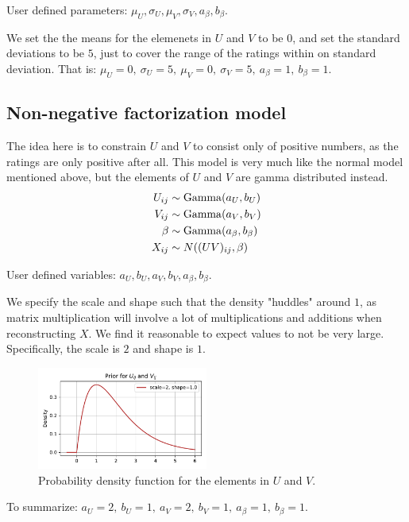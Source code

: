 \documentclass[12pt]{article}
\begin{document}
    User defined parameters: $\mu_U, \sigma_U, \mu_V, \sigma_V, a_\beta, b_\beta$.
    
    \vspace{3mm}
    We set the the means for the elemenets in $U$ and $V$ to be $0$, and set the standard deviations to be $5$, just to cover the range of the ratings within on standard deviation. That is: $\mu_U=0,\ \sigma_U=5,\ \mu_V=0,\ \sigma_V=5,\ a_\beta=1,\ b_\beta=1$.

    \subsection{Non-negative factorization model}
    The idea here is to constrain $U$ and $V$ to consist only of positive numbers, as the ratings are only positive after all. This model is very much like the normal model mentioned above, but the elements of $U$ and $V$ are gamma distributed instead.
    \begin{align*}
        U_{ij} &\sim \operatorname{Gamma}(a_U, b_U) \\
        V_{ij} &\sim \operatorname{Gamma}(a_V, b_V) \\
        \beta  &\sim \operatorname{Gamma}(a_\beta, b_\beta) \\
        X_{ij} &\sim N((UV)_{ij}, \beta) 
    \end{align*}

    User defined variables: $a_U, b_U, a_V, b_V, a_\beta, b_\beta$.
    
    \vspace{3mm}
    We specify the scale and shape such that the density "huddles" around $1$, as matrix multiplication will involve a lot of multiplications and additions when reconstructing $X$. We find it reasonable to expect values to not be very large. Specifically, the scale is $2$ and shape is $1$.
    \begin{figure}[H]
        \centering
        \includegraphics[width=0.5\textwidth]{nmfprior.pdf}
        \caption{Probability density function for the elements in $U$ and $V$.}
    \end{figure}
    To summarize: $a_U=2,\ b_U=1,\ a_V=2,\ b_V=1,\ a_\beta=1,\ b_\beta=1$.
\end{document}
